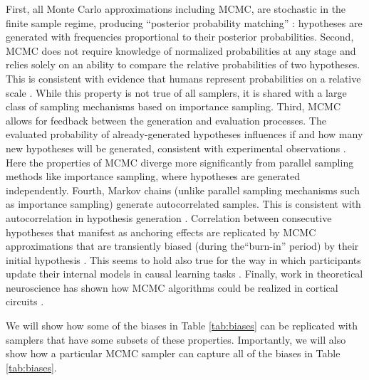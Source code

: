 First, all Monte Carlo approximations including MCMC, are stochastic in the finite sample regime, producing ``posterior probability matching'' \citep{wozny2010,Denison2013,Moreno11,Vul2014}: hypotheses are generated with frequencies proportional to their posterior probabilities. Second, MCMC does not require knowledge of normalized probabilities at any stage and relies solely on an ability to compare the relative probabilities of two hypotheses. This is consistent with evidence that humans represent probabilities on a relative scale \citep{stewart06}. While this property is not true of all samplers, it is shared with a large class of sampling mechanisms based on importance sampling. Third, MCMC allows for feedback between the generation and evaluation processes. The evaluated probability of already-generated hypotheses influences if and how many new hypotheses will be generated, consistent with experimental observations \citep{hamrick2015think}. Here the properties of MCMC diverge more significantly from parallel sampling methods like importance sampling, where hypotheses are generated independently. Fourth, Markov chains (unlike parallel sampling mechanisms such as importance sampling) generate autocorrelated samples. This is consistent with autocorrelation in hypothesis generation \citep{multistability,vul08,Bonawitz2014}. Correlation between consecutive hypotheses that manifest as anchoring effects \citep[where judgments are biased by the initial hypothesis;][]{tversky} are replicated by MCMC approximations that are transiently biased (during the``burn-in'' period) by their initial hypothesis \citep{lieder2017anchoring,lieder2017empirical}. This seems to hold also true for the way in which participants update their internal models in causal learning tasks \citep{bramley2017formalizing}. Finally, work in theoretical neuroscience has shown how MCMC algorithms could be realized in cortical circuits \citep{buesing11,pecevski11,Moreno11}.

We will show how some of the biases in Table \ref{tab:biases} can be replicated with samplers that have some  subsets of these properties. Importantly, we will also show how a particular MCMC sampler can capture all of the biases in Table \ref{tab:biases}.



